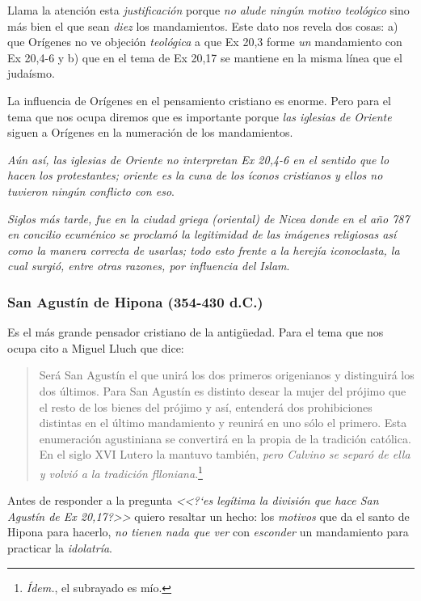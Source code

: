 \documentclass{article}
\begin{document}
\noindent
Llama la atenci\'on esta \emph{justificaci\'on} porque \emph{no alude ning\'un motivo teol\'ogico} sino m\'as bien el que sean \emph{diez} los mandamientos. Este dato nos revela dos cosas: a) que Or\'{i}genes no ve objeci\'on \emph{teol\'ogica} a que Ex 20,3 forme \emph{un} mandamiento con Ex 20,4-6 y b) que en el tema de Ex 20,17 se mantiene en la misma l\'{i}nea que el juda\'{i}smo.

La influencia de Or\'{i}genes en el pensamiento cristiano es enorme. Pero para el tema que nos ocupa diremos que es importante porque \emph{las iglesias de Oriente} siguen a Or\'{i}genes en la numeraci\'on de los mandamientos.

\emph{A\'un as\'{i}, las iglesias de Oriente no interpretan Ex 20,4-6 en el sentido que lo hacen los protestantes; oriente es la cuna de los \'{i}conos cristianos y ellos no tuvieron ning\'un conflicto con eso}. 

\emph{Siglos m\'as tarde, fue en la ciudad griega (oriental) de Nicea donde en el a\~no 787 en concilio ecum\'enico se proclam\'o la legitimidad de las im\'agenes religiosas as\'{i} como la manera correcta de usarlas; todo esto frente a la herej\'{i}a iconoclasta, la cual surgi\'o, entre otras razones, por influencia del Islam}.

\subsubsection{San Agust\'{i}n de Hipona (354-430 d.C.)}

Es el m\'as grande pensador cristiano de la antig\"uedad. Para el tema que nos ocupa cito a Miguel Lluch que dice:

\begin{quote}
Será San Agustín el que unirá los dos primeros origenianos
y distinguirá los dos últimos. Para San Agustín es distinto desear
la mujer del prójimo que el resto de los bienes del prójimo y así, entenderá
dos prohibiciones distintas en el último mandamiento y reunirá en uno
sólo el primero. Esta enumeración agustiniana se convertirá en la propia
de la tradición católica. En el siglo XVI Lutero la mantuvo también, \emph{pero
Calvino se separó de ella y volvió a la tradición flloniana}.\footnote{\emph{\'{I}dem.}, el subrayado es m\'{i}o.}
\end{quote}

\noindent
Antes de responder a la pregunta \emph{<<?`es leg\'{i}tima la divisi\'on que hace San Agust\'{i}n de Ex 20,17?>>} quiero resaltar un hecho: los \emph{motivos} que da el santo de Hipona para hacerlo, \emph{no tienen nada que ver} con \emph{esconder} un mandamiento para practicar la \emph{idolatr\'{i}a}.
\end{document}
